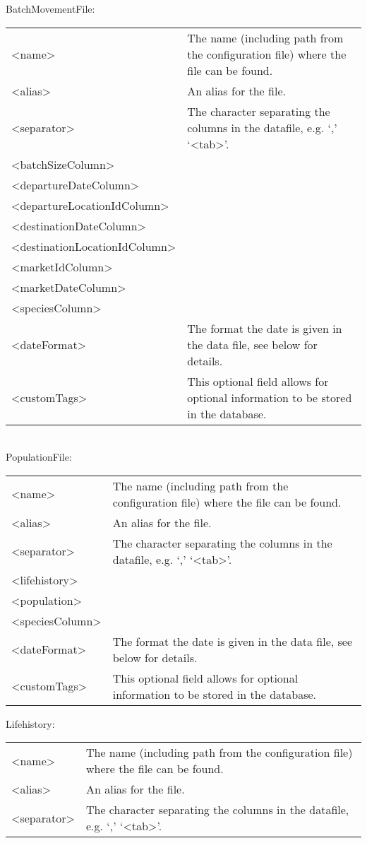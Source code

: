 BatchMovementFile:

\begin{tabulary}{1.0\textwidth}{l p{9cm}}
\toprule
<name> & The name (including path from the configuration file) where the file can be found.\\
<alias> & An alias for the file.\\
<separator> & The character separating the columns in the datafile, e.g. `,' `<tab>'.\\
<batchSizeColumn> & \\
<departureDateColumn> & \\
<departureLocationIdColumn> & \\
<destinationDateColumn> & \\
<destinationLocationIdColumn> & \\
<marketIdColumn> & \\
<marketDateColumn> & \\
<speciesColumn> & \\
<dateFormat> & The format the date is given in the data file, see below for details.\\
<customTags> & This optional field allows for optional information to be stored in the database.\\
\bottomrule
\end{tabulary}\\

PopulationFile:

\begin{tabulary}{1.0\textwidth}{l p{9cm}}
\toprule
<name> & The name (including path from the configuration file) where the file can be found.\\
<alias> & An alias for the file.\\
<separator> & The character separating the columns in the datafile, e.g. `,' `<tab>'.\\
<lifehistory> & \\
<population> & \\
<speciesColumn> & \\
<dateFormat> & The format the date is given in the data file, see below for details.\\
<customTags> & This optional field allows for optional information to be stored in the database.\\
\bottomrule
\end{tabulary}

Lifehistory:

\begin{tabulary}{1.0\textwidth}{l p{9cm}}
\toprule
<name> & The name (including path from the configuration file) where the file can be found.\\
<alias> & An alias for the file.\\
<separator> & The character separating the columns in the datafile, e.g. `,' `<tab>'.\\
\bottomrule
\end{tabulary}

